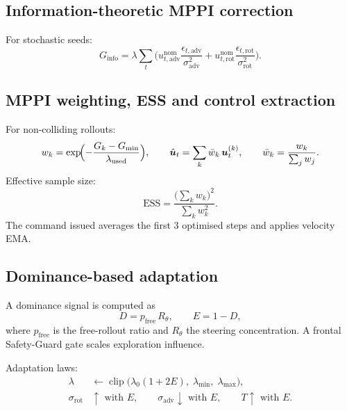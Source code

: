 \documentclass[a4paper, 11pt]{article}
\newcommand{\vect}[1]{\bm{#1}}
\begin{document}
\subsection{Information-theoretic MPPI correction}

For stochastic seeds:
\begin{equation}
  G_{\text{info}}
  = \lambda \sum_t
    \biggl(
      u_{t,\text{adv}}^{\text{nom}}
      \frac{\epsilon_{t,\text{adv}}}{\sigma_{\text{adv}}^2}
      +
      u_{t,\text{rot}}^{\text{nom}}
      \frac{\epsilon_{t,\text{rot}}}{\sigma_{\text{rot}}^2}
    \biggr).
\end{equation}

\subsection{MPPI weighting, ESS and control extraction}

For non-colliding rollouts:
\begin{equation}
  w_k = \exp\!\Bigl(-\frac{G_k - G_{\min}}{\lambda_{\text{used}}}\Bigr),
  \qquad
  \hat{\vect{u}}_t = \sum_k \bar{w}_k\,\vect{u}_t^{(k)},
  \qquad
  \bar{w}_k = \frac{w_k}{\sum_j w_j}.
\end{equation}
Effective sample size:
\begin{equation}
  \mathrm{ESS}
  = \frac{\bigl(\sum_k w_k\bigr)^2}{\sum_k w_k^2}.
\end{equation}
The command issued averages the first 3 optimised steps and applies
velocity EMA.

\subsection{Dominance-based adaptation}

A dominance signal is computed as
\begin{equation}
  D = p_{\text{free}}\,R_\theta,
  \qquad
  E = 1 - D,
\end{equation}
where $p_{\text{free}}$ is the free-rollout ratio and $R_\theta$ the
steering concentration.  A frontal Safety-Guard gate scales exploration
influence.

Adaptation laws:
\begin{align}
  \lambda &\leftarrow \operatorname{clip}\!\bigl(
    \lambda_0(1 + 2E),\; \lambda_{\min},\; \lambda_{\max}\bigr), \\
  \sigma_{\text{rot}} &\uparrow \text{ with } E, \qquad
  \sigma_{\text{adv}} \downarrow \text{ with } E, \qquad
  T \uparrow \text{ with } E.
\end{align}
\end{document}
